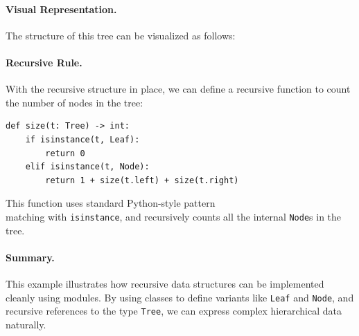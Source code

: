 \documentclass[sigplan,screen]{acmart}
\begin{document}
\paragraph{Visual Representation.}
The structure of this tree can be visualized as follows:

\begin{center}
\end{center}

\paragraph{Recursive Rule.}
With the recursive structure in place, we can define a recursive function to count the number of nodes in the tree:

\begin{verbatim}
def size(t: Tree) -> int:
	if isinstance(t, Leaf):
		return 0
	elif isinstance(t, Node):
		return 1 + size(t.left) + size(t.right)
\end{verbatim}

This function uses standard Python-style pattern \\matching with \texttt{isinstance}, and recursively counts all the internal \texttt{Node}s in the tree.

\paragraph{Summary.}
This example illustrates how recursive data structures can be implemented cleanly using modules. By using classes to define variants like \texttt{Leaf} and \texttt{Node}, and recursive references to the type \texttt{Tree}, we can express complex hierarchical data naturally.
\end{document}
